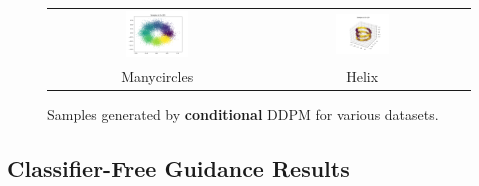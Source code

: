 \documentclass[11pt]{article}
\begin{document}
\begin{figure}[H]
\begin{tabular}{ccc}
        
        \includegraphics[width=0.3\textwidth]{exps/ddpm_2_150_0.0001_0.02_manycircles/samples_conditional_150.png} &
        \includegraphics[width=0.3\textwidth]{exps/ddpm_3_150_0.0001_0.02_helix/samples_conditional_150.png} & \\
        Manycircles & Helix & \\
    \end{tabular}
    \caption{Samples generated by \textbf{conditional} DDPM for various datasets.}
    \label{fig:cond_all_data}
\end{figure}

\newpage

\subsection{Classifier-Free Guidance Results}
\end{document}
